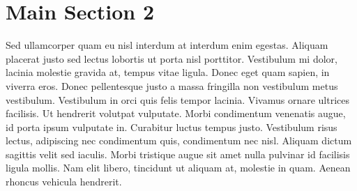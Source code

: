 
\section{Main Section 2}

Sed ullamcorper quam eu nisl interdum at interdum enim egestas. Aliquam placerat justo sed lectus lobortis ut porta nisl porttitor. Vestibulum mi dolor, lacinia molestie gravida at, tempus vitae ligula. Donec eget quam sapien, in viverra eros. Donec pellentesque justo a massa fringilla non vestibulum metus vestibulum. Vestibulum in orci quis felis tempor lacinia. Vivamus ornare ultrices facilisis. Ut hendrerit volutpat vulputate. Morbi condimentum venenatis augue, id porta ipsum vulputate in. Curabitur luctus tempus justo. Vestibulum risus lectus, adipiscing nec condimentum quis, condimentum nec nisl. Aliquam dictum sagittis velit sed iaculis. Morbi tristique augue sit amet nulla pulvinar id facilisis ligula mollis. Nam elit libero, tincidunt ut aliquam at, molestie in quam. Aenean rhoncus vehicula hendrerit.